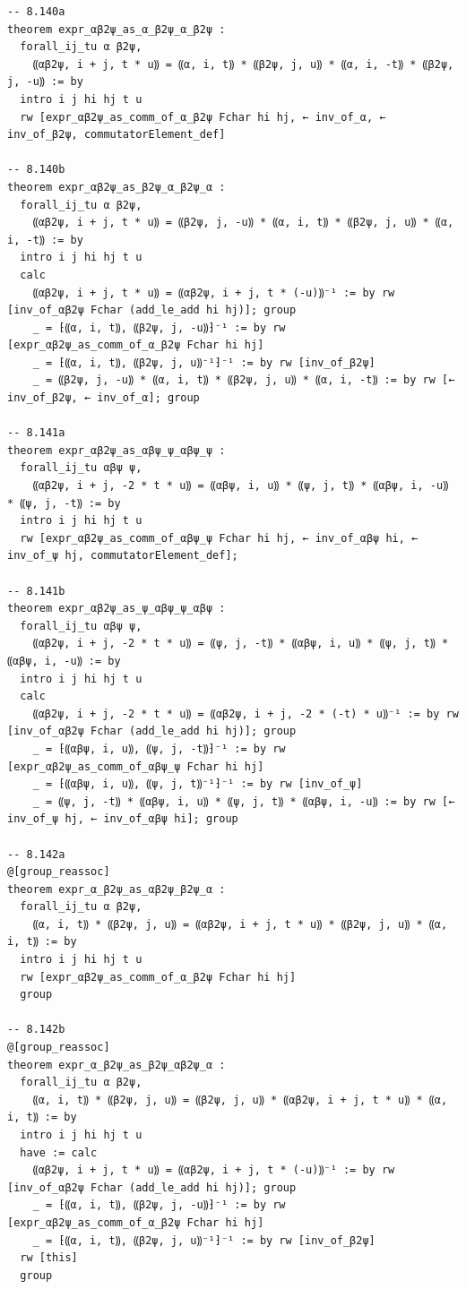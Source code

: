\begin{Verbatim}
-- 8.140a
theorem expr_αβ2ψ_as_α_β2ψ_α_β2ψ :
  forall_ij_tu α β2ψ,
    ⸨αβ2ψ, i + j, t * u⸩ = ⸨α, i, t⸩ * ⸨β2ψ, j, u⸩ * ⸨α, i, -t⸩ * ⸨β2ψ, j, -u⸩ := by
  intro i j hi hj t u
  rw [expr_αβ2ψ_as_comm_of_α_β2ψ Fchar hi hj, ← inv_of_α, ← inv_of_β2ψ, commutatorElement_def]

-- 8.140b
theorem expr_αβ2ψ_as_β2ψ_α_β2ψ_α :
  forall_ij_tu α β2ψ,
    ⸨αβ2ψ, i + j, t * u⸩ = ⸨β2ψ, j, -u⸩ * ⸨α, i, t⸩ * ⸨β2ψ, j, u⸩ * ⸨α, i, -t⸩ := by
  intro i j hi hj t u
  calc
    ⸨αβ2ψ, i + j, t * u⸩ = ⸨αβ2ψ, i + j, t * (-u)⸩⁻¹ := by rw [inv_of_αβ2ψ Fchar (add_le_add hi hj)]; group
    _ = ⁅⸨α, i, t⸩, ⸨β2ψ, j, -u⸩⁆⁻¹ := by rw [expr_αβ2ψ_as_comm_of_α_β2ψ Fchar hi hj]
    _ = ⁅⸨α, i, t⸩, ⸨β2ψ, j, u⸩⁻¹⁆⁻¹ := by rw [inv_of_β2ψ]
    _ = ⸨β2ψ, j, -u⸩ * ⸨α, i, t⸩ * ⸨β2ψ, j, u⸩ * ⸨α, i, -t⸩ := by rw [← inv_of_β2ψ, ← inv_of_α]; group

-- 8.141a
theorem expr_αβ2ψ_as_αβψ_ψ_αβψ_ψ :
  forall_ij_tu αβψ ψ,
    ⸨αβ2ψ, i + j, -2 * t * u⸩ = ⸨αβψ, i, u⸩ * ⸨ψ, j, t⸩ * ⸨αβψ, i, -u⸩ * ⸨ψ, j, -t⸩ := by
  intro i j hi hj t u
  rw [expr_αβ2ψ_as_comm_of_αβψ_ψ Fchar hi hj, ← inv_of_αβψ hi, ← inv_of_ψ hj, commutatorElement_def];

-- 8.141b
theorem expr_αβ2ψ_as_ψ_αβψ_ψ_αβψ :
  forall_ij_tu αβψ ψ,
    ⸨αβ2ψ, i + j, -2 * t * u⸩ = ⸨ψ, j, -t⸩ * ⸨αβψ, i, u⸩ * ⸨ψ, j, t⸩ * ⸨αβψ, i, -u⸩ := by
  intro i j hi hj t u
  calc
    ⸨αβ2ψ, i + j, -2 * t * u⸩ = ⸨αβ2ψ, i + j, -2 * (-t) * u⸩⁻¹ := by rw [inv_of_αβ2ψ Fchar (add_le_add hi hj)]; group
    _ = ⁅⸨αβψ, i, u⸩, ⸨ψ, j, -t⸩⁆⁻¹ := by rw [expr_αβ2ψ_as_comm_of_αβψ_ψ Fchar hi hj]
    _ = ⁅⸨αβψ, i, u⸩, ⸨ψ, j, t⸩⁻¹⁆⁻¹ := by rw [inv_of_ψ]
    _ = ⸨ψ, j, -t⸩ * ⸨αβψ, i, u⸩ * ⸨ψ, j, t⸩ * ⸨αβψ, i, -u⸩ := by rw [← inv_of_ψ hj, ← inv_of_αβψ hi]; group

-- 8.142a
@[group_reassoc]
theorem expr_α_β2ψ_as_αβ2ψ_β2ψ_α :
  forall_ij_tu α β2ψ,
    ⸨α, i, t⸩ * ⸨β2ψ, j, u⸩ = ⸨αβ2ψ, i + j, t * u⸩ * ⸨β2ψ, j, u⸩ * ⸨α, i, t⸩ := by
  intro i j hi hj t u
  rw [expr_αβ2ψ_as_comm_of_α_β2ψ Fchar hi hj]
  group

-- 8.142b
@[group_reassoc]
theorem expr_α_β2ψ_as_β2ψ_αβ2ψ_α :
  forall_ij_tu α β2ψ,
    ⸨α, i, t⸩ * ⸨β2ψ, j, u⸩ = ⸨β2ψ, j, u⸩ * ⸨αβ2ψ, i + j, t * u⸩ * ⸨α, i, t⸩ := by
  intro i j hi hj t u
  have := calc
    ⸨αβ2ψ, i + j, t * u⸩ = ⸨αβ2ψ, i + j, t * (-u)⸩⁻¹ := by rw [inv_of_αβ2ψ Fchar (add_le_add hi hj)]; group
    _ = ⁅⸨α, i, t⸩, ⸨β2ψ, j, -u⸩⁆⁻¹ := by rw [expr_αβ2ψ_as_comm_of_α_β2ψ Fchar hi hj]
    _ = ⁅⸨α, i, t⸩, ⸨β2ψ, j, u⸩⁻¹⁆⁻¹ := by rw [inv_of_β2ψ]
  rw [this]
  group


\end{Verbatim}
